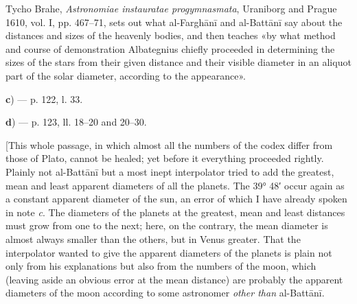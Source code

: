 \documentclass[11pt]{article}
\newcommand{\Pg}[1]{\marginpar{\footnotesize\color{gray}#1}}
\begin{document}
\begin{center}\end{center}
\par Tycho Brahe, \emph{Astronomiae instauratae progymnasmata}, Uraniborg and Prague 1610, vol. I, pp. 467–71, sets out what al-Farghānī and al-Battānī say about the distances and sizes of the heavenly bodies, and then teaches «by what method and course of demonstration Albategnius chiefly proceeded in determining the sizes of the stars from their given distance and their visible diameter in an aliquot part of the solar diameter, according to the appearance».\par
\par\begin{center}\textbf{c}) — p. 122, l. 33.\end{center}
\par [«\emph{The diameter of the sun subtends an arc of 39° 48′}». What this means I do not know. If the \emph{epicycle} of the sun is meant, its diameter is twice the greatest equation of the centre, so 3° 58′, which by no means agrees with the 39° 48′ of the codex (here and on p. 123, l. 21) and the 49° 48′ or 9° 48′ of Plato. If the apparent \emph{diameter of the sun} is meant, al-Battānī, p. 58, sets its mean amount at 32′ 30″. So it must be considered a foolish interpolation, like the one of which I shall speak in the following note. — Schiaparelli.]\par
\par\begin{center}\textbf{d}) — p. 123, ll. 18–20 and 20–30.\end{center}
\par \Pg{I 291}[This whole passage, in which almost all the numbers of the codex differ from those of Plato, cannot be healed; yet before it everything proceeded rightly. Plainly not al-Battānī but a most inept interpolator tried to add the greatest, mean and least apparent diameters of all the planets. The 39° 48′ occur again as a constant apparent diameter of the sun, an error of which I have already spoken in note \emph{c}. The diameters of the planets at the greatest, mean and least distances must grow from one to the next; here, on the contrary, the mean diameter is almost always smaller than the others, but in Venus greater. That the interpolator wanted to give the apparent diameters of the planets is plain not only from his explanations but also from the numbers of the moon, which (leaving aside an obvious error at the mean distance) are probably the apparent diameters of the moon according to some astronomer \emph{other than} al-Battānī.\par
\end{document}
